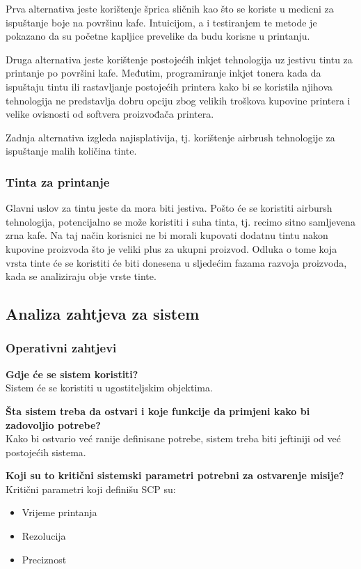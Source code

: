 \documentclass[12pt]{article}
\begin{document}
Prva alternativa jeste korištenje šprica sličnih kao što se koriste u medicni za ispuštanje boje na površinu kafe. Intuicijom, a i testiranjem te metode je pokazano da su početne kapljice prevelike da budu korisne u printanju.

Druga alternativa jeste korištenje postojećih inkjet tehnologija uz jestivu tintu za printanje po površini kafe. Međutim, programiranje inkjet tonera kada da ispuštaju tintu ili rastavljanje postojećih printera kako bi se koristila njihova tehnologija ne predstavlja dobru opciju zbog velikih troškova kupovine printera i velike ovisnosti od softvera proizvođača printera.

Zadnja alternativa izgleda najisplativija, tj. korištenje airbrush tehnologije za ispuštanje malih količina tinte. 

\subsubsection{Tinta za printanje}

Glavni uslov za tintu jeste da mora biti jestiva. Pošto će se koristiti airbursh tehnologija, potencijalno se može koristiti i suha tinta, tj. recimo sitno samljevena zrna kafe. Na taj način korisnici ne bi morali kupovati dodatnu tintu nakon kupovine proizvoda što je veliki plus za ukupni proizvod. Odluka o tome koja vrsta tinte će se koristiti će biti donesena u sljedećim fazama razvoja proizvoda, kada se analiziraju obje vrste tinte.

\newpage

\subsection{Analiza zahtjeva za sistem}
\subsubsection{Operativni zahtjevi}

\textbf{Gdje će se sistem koristiti?}\\
Sistem će se koristiti u ugostiteljskim objektima. 

\textbf{Šta sistem treba da ostvari i koje funkcije da primjeni kako bi zadovoljio potrebe?}\\
Kako bi ostvario već ranije definisane potrebe, sistem treba biti jeftiniji od već postojećih sistema.

\textbf{Koji su to kritični sistemski parametri potrebni za ostvarenje misije?}\\
Kritični parametri koji definišu SCP su:
\begin{itemize}
\item Vrijeme printanja
\item Rezolucija
\item Preciznost
\end{itemize}
\end{document}
